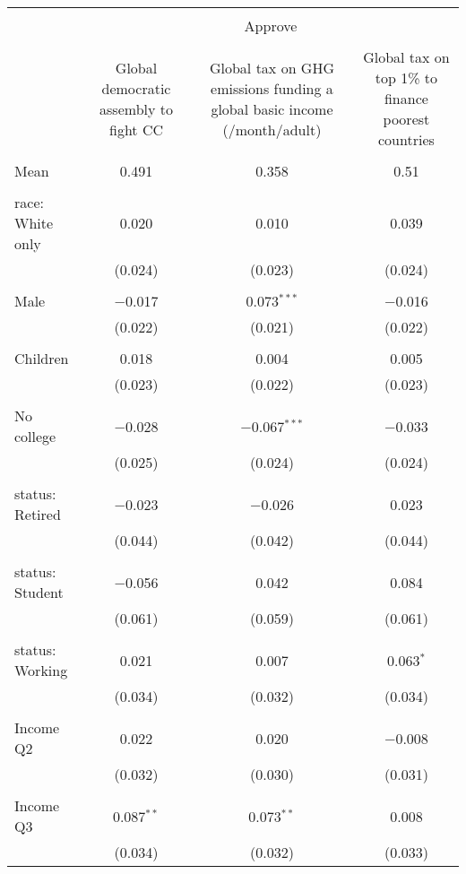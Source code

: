 
\begin{tabular}{@{\extracolsep{5pt}}lccc} 
\\[-1.8ex]\hline 
\hline \\[-1.8ex] 
 & \multicolumn{3}{c}{Approve} \\ 
\cline{2-4} 
\\[-1.8ex] & Global democratic assembly to fight CC & Global tax on GHG emissions funding a global basic income (\textdollar 30/month/adult) & Global tax on top 1\% to finance poorest countries \\ 
\hline \\[-1.8ex] 
 Mean & 0.491 & 0.358 & 0.51  \\ \hline \\[-1.8ex] race: White only & 0.020 & 0.010 & 0.039 \\ 
  & (0.024) & (0.023) & (0.024) \\ 
  & & & \\ 
 Male & $-$0.017 & 0.073$^{***}$ & $-$0.016 \\ 
  & (0.022) & (0.021) & (0.022) \\ 
  & & & \\ 
 Children & 0.018 & 0.004 & 0.005 \\ 
  & (0.023) & (0.022) & (0.023) \\ 
  & & & \\ 
 No college & $-$0.028 & $-$0.067$^{***}$ & $-$0.033 \\ 
  & (0.025) & (0.024) & (0.024) \\ 
  & & & \\ 
 status: Retired & $-$0.023 & $-$0.026 & 0.023 \\ 
  & (0.044) & (0.042) & (0.044) \\ 
  & & & \\ 
 status: Student & $-$0.056 & 0.042 & 0.084 \\ 
  & (0.061) & (0.059) & (0.061) \\ 
  & & & \\ 
 status: Working & 0.021 & 0.007 & 0.063$^{*}$ \\ 
  & (0.034) & (0.032) & (0.034) \\ 
  & & & \\ 
 Income Q2 & 0.022 & 0.020 & $-$0.008 \\ 
  & (0.032) & (0.030) & (0.031) \\ 
  & & & \\ 
 Income Q3 & 0.087$^{**}$ & 0.073$^{**}$ & 0.008 \\ 
  & (0.034) & (0.032) & (0.033) \\ 

\end{tabular}
